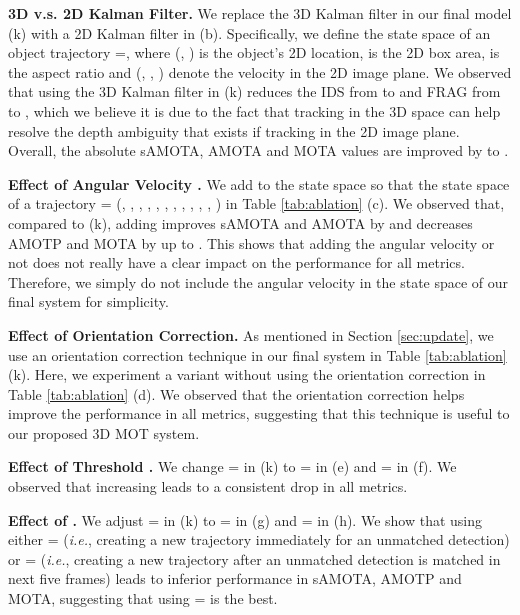 \documentclass[letterpaper, 10 pt, conference]{ieeeconf}
\begin{document}
\vspace{1.5mm}\noindent\textbf{3D v.s. 2D Kalman Filter.} We replace the 3D Kalman filter in our final model (k) with a 2D Kalman filter \cite{Bewley2016} in (b). Specifically, we define the state space of an object trajectory =, where (, ) is the object's 2D location,  is the 2D box area,  is the aspect ratio and (, , ) denote the velocity in the 2D image plane. We observed that using the 3D Kalman filter in (k) reduces the IDS from  to  and FRAG from  to , which we believe it is due to the fact that tracking in the 3D space can help resolve the depth ambiguity that exists if tracking in the 2D image plane. Overall, the absolute sAMOTA, AMOTA and MOTA values are improved by  to .

\vspace{1.5mm}\noindent\textbf{Effect of Angular Velocity .} We add  to the state space so that the state space of a trajectory  = (, , , , , , , , , , , ) in Table \ref{tab:ablation} (c). We observed that, compared to (k), adding  improves sAMOTA and AMOTA by  and decreases AMOTP and MOTA by up to . This shows that adding the angular velocity or not does not really have a clear impact on the performance for all metrics. Therefore, we simply do not include the angular velocity in the state space of our final system for simplicity.

\vspace{1.5mm}\noindent\textbf{Effect of Orientation Correction.} As mentioned in Section \ref{sec:update}, we use an orientation correction technique in our final system in Table \ref{tab:ablation} (k). Here, we experiment a variant without using the orientation correction in Table \ref{tab:ablation} (d). We observed that the orientation correction helps improve the performance in all metrics, suggesting that this technique is useful to our proposed 3D MOT system.

\vspace{1.5mm}\noindent\textbf{Effect of Threshold .} We change = in (k) to = in (e) and = in (f). We observed that increasing  leads to a consistent drop in all metrics.

\vspace{1.5mm}\noindent\textbf{Effect of .} We adjust = in (k) to = in (g) and = in (h). We show that using either = (\emph{i.e.}, creating a new trajectory immediately for an unmatched detection) or = (\emph{i.e.}, creating a new trajectory after an unmatched detection is matched in next five frames) leads to inferior performance in sAMOTA, AMOTP and MOTA, suggesting that using = is the best. 
\end{document}
